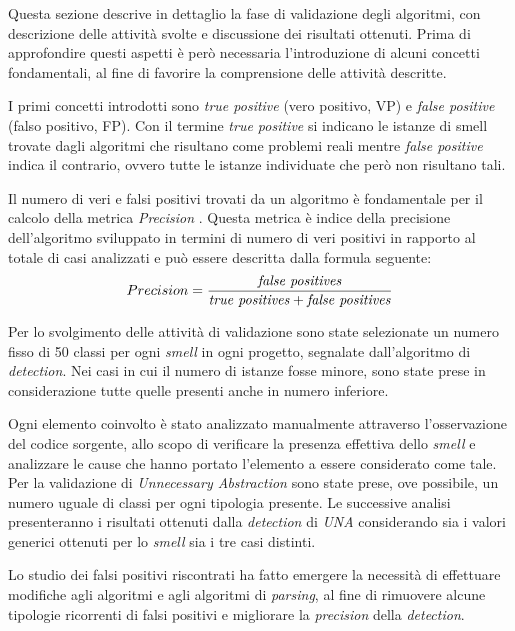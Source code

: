     Questa sezione descrive in dettaglio la fase di validazione degli algoritmi, con descrizione delle attività svolte e discussione dei risultati ottenuti.
    Prima di approfondire questi aspetti è però necessaria l'introduzione di alcuni concetti fondamentali, al fine di favorire la comprensione delle attività descritte.
    
    I primi concetti introdotti sono \textit{true positive} (vero positivo, VP) e \textit{false positive} (falso positivo, FP). Con il termine \textit{true positive} si indicano le istanze di smell trovate dagli algoritmi che risultano come problemi reali mentre \textit{false positive} indica il contrario, ovvero tutte le istanze individuate che però non risultano tali. 
    
    Il numero di veri e falsi positivi trovati da un algoritmo è fondamentale per il calcolo della metrica \textit{Precision} \cite{wikiPrecisionRecall}. Questa metrica è indice della precisione dell'algoritmo sviluppato in termini di numero di veri positivi in rapporto al totale di casi analizzati e può essere descritta dalla formula seguente:
    $$Precision = { \mbox{\textit{false positives}} \over \mbox{\textit{true positives}} + \mbox{\textit{false positives}}}$$
    
    Per lo svolgimento delle attività di validazione sono state selezionate un numero fisso di 50 classi per ogni \textit{smell} in ogni progetto, segnalate dall'algoritmo di \textit{detection}. Nei casi in cui il numero di istanze fosse minore, sono state prese in considerazione tutte quelle presenti anche in numero inferiore.
    
    Ogni elemento coinvolto è stato analizzato manualmente attraverso l'osservazione del codice sorgente, allo scopo di verificare la presenza effettiva dello \textit{smell} e analizzare le cause che hanno portato l'elemento a essere considerato come tale. Per la validazione di \textit{Unnecessary Abstraction} sono state prese, ove possibile, un numero uguale di classi per ogni tipologia presente. Le successive analisi presenteranno i risultati ottenuti dalla \textit{detection} di \textit{UNA} considerando sia i valori generici ottenuti per lo \textit{smell} sia i tre casi distinti.
    
    Lo studio dei falsi positivi riscontrati ha fatto emergere la necessità di effettuare modifiche agli algoritmi e agli algoritmi di \textit{parsing}, al fine di rimuovere alcune tipologie ricorrenti di falsi positivi e migliorare la \textit{precision} della \textit{detection}. 
 
